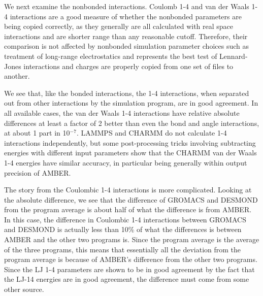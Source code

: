 We next examine the nonbonded interactions. Coulomb 1-4 and van der
Waals 1-4 interactions are a good measure of whether the nonbonded
parameters are being copied correctly, as they generally are all
calculated with real space interactions and are shorter range than any
reasonable cutoff. Therefore, their comparison is not affected by
nonbonded simulation parameter choices such as treatment of long-range
electrostatics and represents the best test of Lennard-Jones
interactions and charges are properly copied from one set of files to
another.

We see that, like the bonded interactions, the 1-4 interactions, when
separated out from other interactions by the simulation program, are
in good agreement.  In all available cases, the van der Waals 1-4
interactions have relative absolute differences at least a factor of 2
better than even the bond and angle interactions, at about 1 part in
10$^{-7}$. LAMMPS and CHARMM do not calculate 1-4 interactions
independently, but some post-processing tricks involving subtracting
energies with different input parameters show that the CHARMM van der
Waals 1-4 energies have similar accuracy, in particular being
generally within output precision of AMBER.

The story from the Coulombic 1-4 interactions is more
complicated. Looking at the absolute difference, we see that the
difference of GROMACS and DESMOND from the program average is about
half of what the difference is from AMBER. In this case, the
difference in Coulombic 1-4 interactions between GROMACS and DESMOND
is actually less than 10\% of what the differences is between AMBER
and the other two programs is. Since the program average is the
average of the three programs, this means that essentially all the
deviation from the program average is because of AMBER's difference
from the other two programs.
Since the LJ 1-4 parameters are shown to be in good agreement by the fact that the LJ-14 energies are in good agreement, 
the difference must come from some other source.

